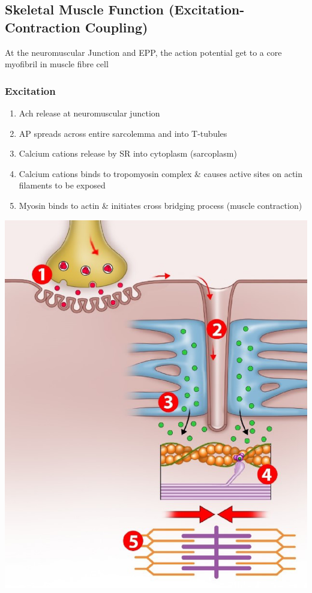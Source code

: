 \documentclass[11pt,fleqn]{book} %
\begin{document}
\subsection{Skeletal Muscle Function (Excitation-Contraction Coupling)}
At the neuromuscular Junction and EPP, the action potential get to a core myofibril in muscle fibre cell 

\subsubsection{Excitation}
\begin{enumerate}
    \item Ach release at neuromuscular junction
    \item AP spreads across
entire sarcolemma and
into T-tubules
    \item Calcium cations release by SR into
cytoplasm (sarcoplasm)
    \item Calcium cations binds to
tropomyosin complex
\& causes active sites on
actin filaments to be
exposed
    \item Myosin binds to actin \&
initiates cross bridging
process (muscle
contraction)
\end{enumerate}
\begin{center}
    \includegraphics[width=0.7\linewidth]{Pictures/Screenshot 2024-04-03 223557.png}
\end{center}
\end{document}
